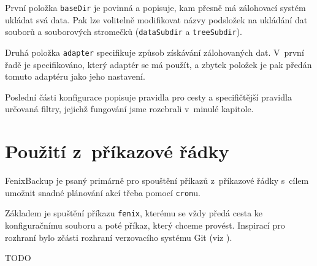 První položka \texttt{baseDir} je povinná a popisuje, kam přesně má zálohovací
systém ukládat svá data. Pak lze volitelně modifikovat názvy podsložek na
ukládání dat souborů a souborových stromečků (\texttt{dataSubdir}
a \texttt{treeSubdir}).

Druhá položka \texttt{adapter} specifikuje způsob získávání zálohovaných dat.
V~první řadě je specifikováno, který adaptér se má použít, a zbytek položek je
pak předán tomuto adaptéru jako jeho nastavení.

Poslední části konfigurace popisuje pravidla pro cesty a specifičtější pravidla
určovaná filtry, jejichž fungování jsme rozebrali v~minulé kapitole.

\section{Použití z~příkazové řádky}

FenixBackup je psaný primárně pro spouštění příkazů z~příkazové řádky s~cílem
umožnit snadné plánování akcí třeba pomocí \texttt{cron}u.

Základem je spuštění příkazu \texttt{fenix}, kterému se vždy předá cesta ke
konfiguračnímu souboru a poté příkaz, který chceme provést. Inspirací pro
rozhraní bylo zčásti rozhraní verzovacího systému Git (viz \cite{progit}).

TODO
